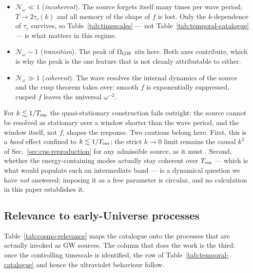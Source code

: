 \documentclass[10pt,prd,aps,nobibnotes,superscriptaddress,preprintnumbers,notitlepage]{revtex4-1}
\begin{document}
\begin{itemize}\itemsep1pt
  \item $\mathcal{N}_\omega\ll1$ (\emph{incoherent}). The source forgets itself
    many times per wave period; $T\to2\tau_c(k)$ and all memory of the shape of
    $f$ is lost. Only the $k$-dependence of $\tau_c$ survives, so
    Table~\ref{tab:timescales} --- not Table~\ref{tab:temporal-catalogue} --- is
    what matters in this regime.
  \item $\mathcal{N}_\omega\sim1$ (\emph{transition}). The peak of
    $\Omega_{\rm GW}$ sits here. Both axes contribute, which is why the peak is
    the one feature that is not cleanly attributable to either.
  \item $\mathcal{N}_\omega\gg1$ (\emph{coherent}). The wave resolves the
    internal dynamics of the source and the cusp theorem takes over: smooth $f$
    is exponentially suppressed, cusped $f$ leaves the universal
    $\omega^{-2}$.
\end{itemize}

For $k\lesssim1/T_{\rm em}$ the quasi-stationary construction fails outright:
the source cannot be resolved as stationary over a window shorter than the wave
period, and the window itself, not $f$, shapes the response. Two cautions belong
here. First, this is a \emph{band} effect confined to $k\lesssim1/T_{\rm em}$;
the strict $k\to0$ limit remains the causal $k^{3}$ of
Sec.~\ref{sec:cps-reproduction} for any admissible source, as it must
\cite{Cai:2019cdl}. Second, whether the energy-containing modes actually stay
coherent over $T_{\rm em}$ --- which is what would populate such an intermediate
band --- is a dynamical question we have \emph{not} answered; imposing it as a
free parameter is circular, and no calculation in this paper establishes it.

\subsection{Relevance to early-Universe processes}
\label{sec:cosmo-relevance}

Table~\ref{tab:cosmo-relevance} maps the catalogue onto the processes that are
actually invoked as GW sources. The column that does the work is the third: once
the controlling timescale is identified, the row of
Table~\ref{tab:temporal-catalogue} and hence the ultraviolet behaviour follow.
\end{document}
